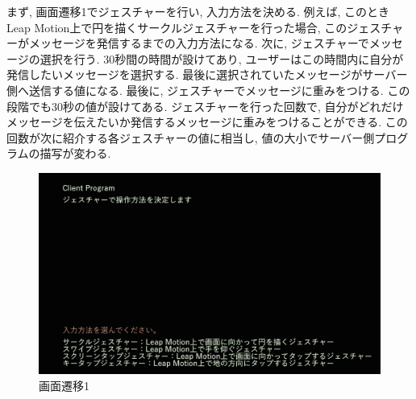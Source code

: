 \documentclass{funthesis}
\begin{document}
まず, 画面遷移1でジェスチャーを行い, 入力方法を決める. 例えば, このときLeap Motion上で円を描くサークルジェスチャーを行った場合, このジェスチャーがメッセージを発信するまでの入力方法になる. 
次に, ジェスチャーでメッセージの選択を行う. 30秒間の時間が設けてあり, ユーザーはこの時間内に自分が発信したいメッセージを選択する. 最後に選択されていたメッセージがサーバー側へ送信する値になる. %
最後に, ジェスチャーでメッセージに重みをつける. この段階でも30秒の値が設けてある. ジェスチャーを行った回数で, 自分がどれだけメッセージを伝えたいか発信するメッセージに重みをつけることができる. この回数が次に紹介する各ジェスチャーの値に相当し, 値の大小でサーバー側プログラムの描写が変わる. 

\begin{figure}[H]
  \begin{center}
  \includegraphics[width=120mm]{./img/clseni1.png}
  \end{center}
  \caption{画面遷移1}
  \label{senni1}
 \end{figure}
 
\end{document}
